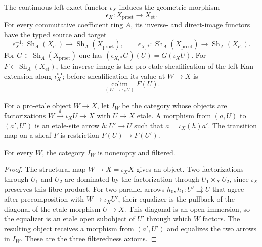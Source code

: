 \begin{definition}
\label{def:weil-pbc-epsilon-comparison}
\uses{}

The continuous left-exact functor $\iota_X$ induces the geometric morphism
\[
 \epsilon_X:X_{\mathrm{proet}}\longrightarrow X_{\mathrm{et}}.
\]
For every commutative coefficient ring $A$, its inverse- and direct-image
functors have the typed source and target
\[
 \epsilon_X^{-1}:\operatorname{Sh}_A(X_{\mathrm{et}})
   \longrightarrow\operatorname{Sh}_A(X_{\mathrm{proet}}),
 \qquad
 \epsilon_{X,*}:\operatorname{Sh}_A(X_{\mathrm{proet}})
   \longrightarrow\operatorname{Sh}_A(X_{\mathrm{et}}).
\]
For $G\in\operatorname{Sh}_A(X_{\mathrm{proet}})$ one has
$(\epsilon_{X,*}G)(U)=G(\iota_XU)$.  For
$F\in\operatorname{Sh}_A(X_{\mathrm{et}})$, the inverse image is the
pro-etale sheafification of the left Kan extension along $\iota_X^{\mathrm{op}}$;
before sheafification its value at $W\to X$ is
\[
 \underset{(W\to\iota_XU)}{\operatorname{colim}}F(U).
\]
\end{definition}


\begin{definition}
\label{def:weil-pbc-epsilon-factorization-index-v1}
For a pro-etale object $W\to X$, let $I_W$ be the category whose objects are
factorizations $W\xrightarrow{a}\iota_XU\to X$ with $U\to X$ etale.  A
morphism from $(a,U)$ to $(a',U')$ is an etale-site arrow $h:U'\to U$ such
that $a=\iota_X(h)a'$.  The transition map on a sheaf $F$ is restriction
$F(U)\to F(U')$.
\end{definition}

\begin{lemma}
\label{lemma:weil-pbc-epsilon-factorization-index-filtered-v1}
For every $W$, the category $I_W$ is nonempty and filtered.
\end{lemma}
\begin{proof}
The structural map $W\to X=\iota_XX$ gives an object.  Two factorizations
through $U_1$ and $U_2$ are dominated by the factorization through
$U_1\times_XU_2$, since $\iota_X$ preserves this fibre product.  For two
parallel arrows $h_0,h_1:U'\rightrightarrows U$ that agree after precomposition
with $W\to\iota_XU'$, their equalizer is the pullback of the diagonal of the
etale morphism $U\to X$.  This diagonal is an open immersion, so the
equalizer is an etale open subobject of $U'$ through which $W$ factors.  The
resulting object receives a morphism from $(a',U')$ and equalizes the two
arrows in $I_W$.  These are the three filteredness axioms.
\end{proof}

